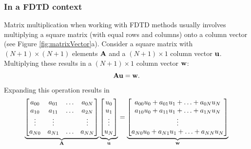 \subsubsection{In a FDTD context}
Matrix multiplication when working with FDTD methods usually involves multiplying a square matrix (with equal rows and columns) onto a column vector (see Figure \ref{fig:matrixVector}a). Consider a square matrix with $(N+1)\times (N+1)$ elements $\mathbf{A}$ and a $(N+1) \times 1$ column vector $\mathbf{u}$. Multiplying these results in a $(N+1) \times 1$ column vector $\mathbf{w}$:
\begin{equation}
    \mathbf{A}\mathbf{u} = \mathbf{w}.
\end{equation}
Expanding this operation results in 
\begin{equation}
    \underbrace{\begin{bmatrix}
        a_{00} & a_{01} & \hdots & a_{0N}\\
        a_{10} & a_{11} & \hdots & a_{2N}\\
        \vdots & \vdots & &\vdots\\
        a_{N0} & a_{N1} & \hdots & a_{NN}
    \end{bmatrix}}_{\mathbf{A}}
    \underbrace{\begin{bmatrix}
        u_0\\
        u_1\\
        \vdots\\
        u_N
    \end{bmatrix}}_{\mathbf{u}} = 
    \underbrace{\begin{bmatrix}
        a_{00}u_0 + a_{01}u_1 + \hdots + a_{0N}u_N\\
        a_{10}u_0 + a_{11}u_1 + \hdots + a_{1N}u_N\\
        \vdots\\
        a_{N0}u_0 + a_{N1}u_1 + \hdots + a_{NN}u_N
    \end{bmatrix}}_{\mathbf{w}}
\end{equation}



